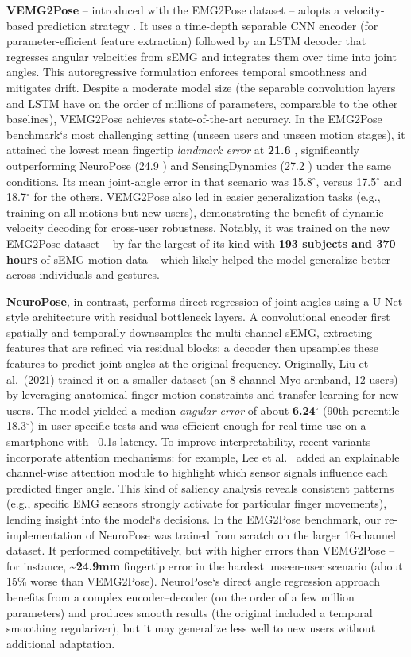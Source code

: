 \textbf{VEMG2Pose} -- introduced with the EMG2Pose dataset -- adopts a velocity-based prediction strategy \cite{salter2024emg2pose}. It uses a time-depth separable CNN encoder (for parameter-efficient feature extraction) followed by an LSTM decoder that regresses angular velocities from sEMG and integrates them over time into joint angles. This autoregressive formulation enforces temporal smoothness and mitigates drift. Despite a moderate model size (the separable convolution layers and LSTM have on the order of millions of parameters, comparable to the other baselines), VEMG2Pose achieves state-of-the-art accuracy. In the EMG2Pose benchmark`s most challenging setting (unseen users and unseen motion stages), it attained the lowest mean fingertip \textit{landmark error} at \textbf{21.6 \textpm 2.0mm}, significantly outperforming NeuroPose (24.9 \textpm 1.7mm) and SensingDynamics (27.2 \textpm 2.0mm) under the same conditions. Its mean joint-angle error in that scenario was 15.8$^\circ$, versus 17.5$^\circ$ and 18.7$^\circ$ for the others. VEMG2Pose also led in easier generalization tasks (e.g., training on all motions but new users), demonstrating the benefit of dynamic velocity decoding for cross-user robustness. Notably, it was trained on the new EMG2Pose dataset -- by far the largest of its kind with \textbf{193 subjects and 370 hours} of sEMG-motion data -- which likely helped the model generalize better across individuals and gestures.

\textbf{NeuroPose}, in contrast, performs direct regression of joint angles using a U-Net style architecture with residual bottleneck layers. A convolutional encoder first spatially and temporally downsamples the multi-channel sEMG, extracting features that are refined via residual blocks; a decoder then upsamples these features to predict joint angles at the original frequency. Originally, Liu et al.\ (2021) trained it on a smaller dataset (an 8-channel Myo armband, 12 users) by leveraging anatomical finger motion constraints and transfer learning for new users. The model yielded a median \textit{angular error} of about \textbf{6.24$^\circ$} (90th percentile 18.3$^\circ$) in user-specific tests and was efficient enough for real-time use on a smartphone with ~0.1s latency. To improve interpretability, recent variants incorporate attention mechanisms: for example, Lee et al.\ \cite{lee2022explainable} added an explainable channel-wise attention module to highlight which sensor signals influence each predicted finger angle. This kind of saliency analysis reveals consistent patterns (e.g., specific EMG sensors strongly activate for particular finger movements), lending insight into the model`s decisions. In the EMG2Pose benchmark, our re-implementation of NeuroPose was trained from scratch on the larger 16-channel dataset. It performed competitively, but with higher errors than VEMG2Pose -- for instance, \textasciitilde{}\textbf{24.9mm} fingertip error in the hardest unseen-user scenario (about 15\% worse than VEMG2Pose). NeuroPose`s direct angle regression approach benefits from a complex encoder--decoder (on the order of a few million parameters) and produces smooth results (the original included a temporal smoothing regularizer), but it may generalize less well to new users without additional adaptation.

